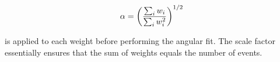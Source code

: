 \begin{equation}
  \centering
\alpha = \left(\frac{\sum_{i} w_i}{\sum_{i} w_i^2}\right)^{1/2}
\label{sWeights_scale_factor}
\end{equation}

\noindent is applied to each weight before performing the angular fit. The scale factor essentially ensures that the sum of weights
equals the  number of events.
